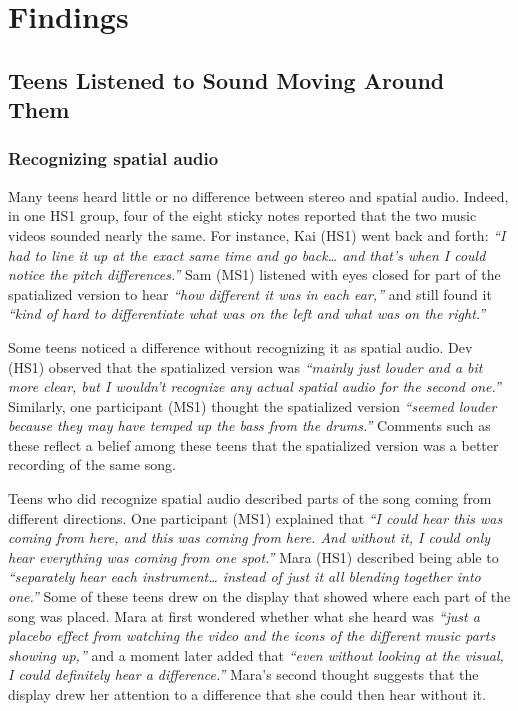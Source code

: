 \section{Findings} \label{sec:findings}
\subsection{Teens Listened to Sound Moving Around Them} \label{sec:4.1}

\subsubsection{Recognizing spatial audio}

Many teens heard little or no difference between stereo and spatial audio. Indeed, in one HS1 group, four of the eight sticky notes reported that the two music videos sounded nearly the same. For instance, Kai (HS1) went back and forth: \textit{``I had to line it up at the exact same time and go back\ldots{} and that's when I could notice the pitch differences.''} Sam (MS1) listened with eyes closed for part of the spatialized version to hear \textit{``how different it was in each ear,''} and still found it \textit{``kind of hard to differentiate what was on the left and what was on the right.''}

Some teens noticed a difference without recognizing it as spatial audio. Dev (HS1) observed that the spatialized version was \textit{``mainly just louder and a bit more clear, but I wouldn't recognize any actual spatial audio for the second one.''} Similarly, one participant (MS1) thought the spatialized version \textit{``seemed louder because they may have temped up the bass from the drums.''} Comments such as these reflect a belief among these teens that the spatialized version was a better recording of the same song.

Teens who did recognize spatial audio described parts of the song coming from different directions. One participant (MS1) explained that \textit{``I could hear this was coming from here, and this was coming from here. And without it, I could only hear everything was coming from one spot.''} Mara (HS1) described being able to \textit{``separately hear each instrument\ldots{} instead of just it all blending together into one.''} Some of these teens drew on the display that showed where each part of the song was placed. Mara at first wondered whether what she heard was \textit{``just a placebo effect from watching the video and the icons of the different music parts showing up,''} and a moment later added that \textit{``even without looking at the visual, I could definitely hear a difference.''} Mara's second thought suggests that the display drew her attention to a difference that she could then hear without it.

